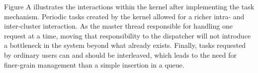 	Figure A illustrates the interactions within the kernel after implementing
	the task mechanism. Periodic tasks created by the kernel allowed for
	a richer intra- and inter-cluster interaction. As the master thread
	responsible for handling one request at a time, moving that responsibility
	to the dispatcher will not introduce a bottleneck in the system beyond what
	already exists. Finally, tasks requested by ordinary users can and should
	be interleaved, which leads to the need for finer-grain management than
	a simple insertion in a queue.

